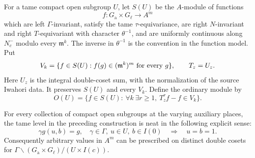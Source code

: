 For a tame compact open subgroup \(U\), let \(S(U)\) be the \(A\)-module
of functions
\[
 f:G_{\mathrm a}\times G_\ell\longrightarrow A^m
\]
which are left \(\Gamma\)-invariant, satisfy the tame
\(\tau\)-equivariance, are right \(N\)-invariant and right \(T\)-equivariant
with character \(\theta^{-1}\), and are uniformly continuous along
\(N^-_c\) modulo every \(\mathfrak m^k\).
The inverse in \(\theta^{-1}\) is the convention in the function model.
Put
\[
 V_k=\{f\in S(U):f(g)\in(\mathfrak m^k)^m\ \hbox{for every }g\},
 \qquad T_z=U_z.
\]
Here \(U_z\) is the integral double-coset sum, with the normalization of
the source Iwahori data.  It preserves \(S(U)\) and every \(V_k\).
Define the ordinary module by
\[
 O(U)=
 \{f\in S(U):\ \forall k\ \exists r\geq1,\
                 T_z^r f-f\in V_k\}.
 \tag{OC2}
\]

\begin{srlemma}
\label{lem:ordinary-neat-level}
For every collection of compact open subgroups at the varying
auxiliary places, the tame level in the preceding construction is
neat in the following explicit sense:
\[
 \gamma g(u,b)=g,\quad
 \gamma\in\Gamma,\ u\in U,\ b\in I(0)
 \quad\Longrightarrow\quad u=b=1.
 \tag{OC3}
\]
Consequently arbitrary values in \(A^m\) can be prescribed on distinct
double cosets for \(\Gamma\backslash
(G_{\mathrm a}\times G_\ell)/(U\times I(c))\).
\end{srlemma}

